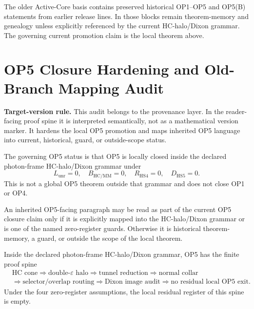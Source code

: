 \begin{remark}
The older Active-Core basis contains preserved historical OP1--OP5 and OP5(B) statements from earlier release lines. In those blocks remain theorem-memory and genealogy unless explicitly referenced by the current HC-halo/Dixon grammar. The governing current promotion claim is the local theorem above.
\end{remark}


\clearpage
\section*{OP5 Closure Hardening and Old-Branch Mapping Audit}
\noindent\textbf{Target-version rule.} This audit belongs to the provenance layer. In the reader-facing proof spine it is interpreted semantically, not as a mathematical version marker. It hardens the local OP5 promotion and maps inherited OP5 language into current, historical, guard, or outside-scope status.

\begin{definition}
The governing OP5 status is that OP5 is locally closed inside the declared photon-frame HC-halo/Dixon grammar under \[L_{\mathrm{unr}}=0,\quad B_{\mathrm{HC}/\mathrm{MM}}=0,\quad R_{\mathrm{HS4}}=0,\quad D_{\mathrm{HS5}}=0.\] This is not a global OP5 theorem outside that grammar and does not close OP1 or OP4.
\end{definition}

\begin{proposition}
An inherited OP5-facing paragraph may be read as part of the current OP5 closure claim only if it is explicitly mapped into the HC-halo/Dixon grammar or is one of the named zero-register guards. Otherwise it is historical theorem-memory, a guard, or outside the scope of the local theorem.
\end{proposition}

\begin{theorem}
Inside the declared photon-frame HC-halo/Dixon grammar, OP5 has the finite proof spine
\[
\begin{aligned}
&\text{HC cone}
\Rightarrow
\text{double-}\varepsilon\text{ halo}
\Rightarrow
\text{tunnel reduction}
\Rightarrow
\text{normal collar}\\[0.35em]
&\Rightarrow
\text{selector/overlap routing}
\Rightarrow
\text{Dixon image audit}
\Rightarrow
\text{no residual local OP5 exit}.
\end{aligned}
\]
Under the four zero-register assumptions, the local residual register of this spine is empty.
\end{theorem}


